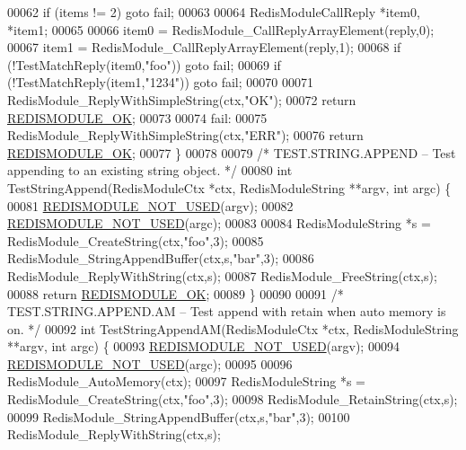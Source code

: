 \begin{DoxyCode}
00062     \textcolor{keywordflow}{if} (items != 2) \textcolor{keywordflow}{goto} fail;
00063 
00064     RedisModuleCallReply *item0, *item1;
00065 
00066     item0 = RedisModule\_CallReplyArrayElement(reply,0);
00067     item1 = RedisModule\_CallReplyArrayElement(reply,1);
00068     \textcolor{keywordflow}{if} (!TestMatchReply(item0,\textcolor{stringliteral}{"foo"})) \textcolor{keywordflow}{goto} fail;
00069     \textcolor{keywordflow}{if} (!TestMatchReply(item1,\textcolor{stringliteral}{"1234"})) \textcolor{keywordflow}{goto} fail;
00070 
00071     RedisModule\_ReplyWithSimpleString(ctx,\textcolor{stringliteral}{"OK"});
00072     \textcolor{keywordflow}{return} \hyperlink{redismodule_8h_a1bc5bfd69abcd378ff52c640adc5418d}{REDISMODULE\_OK};
00073 
00074 fail:
00075     RedisModule\_ReplyWithSimpleString(ctx,\textcolor{stringliteral}{"ERR"});
00076     \textcolor{keywordflow}{return} \hyperlink{redismodule_8h_a1bc5bfd69abcd378ff52c640adc5418d}{REDISMODULE\_OK};
00077 \}
00078 
00079 \textcolor{comment}{/* TEST.STRING.APPEND -- Test appending to an existing string object. */}
00080 \textcolor{keywordtype}{int} TestStringAppend(RedisModuleCtx *ctx, RedisModuleString **argv, \textcolor{keywordtype}{int} argc) \{
00081     \hyperlink{redismodule_8h_a46d75d81383a00bd6b941af6cadf64c2}{REDISMODULE\_NOT\_USED}(argv);
00082     \hyperlink{redismodule_8h_a46d75d81383a00bd6b941af6cadf64c2}{REDISMODULE\_NOT\_USED}(argc);
00083 
00084     RedisModuleString *s = RedisModule\_CreateString(ctx,\textcolor{stringliteral}{"foo"},3);
00085     RedisModule\_StringAppendBuffer(ctx,s,\textcolor{stringliteral}{"bar"},3);
00086     RedisModule\_ReplyWithString(ctx,s);
00087     RedisModule\_FreeString(ctx,s);
00088     \textcolor{keywordflow}{return} \hyperlink{redismodule_8h_a1bc5bfd69abcd378ff52c640adc5418d}{REDISMODULE\_OK};
00089 \}
00090 
00091 \textcolor{comment}{/* TEST.STRING.APPEND.AM -- Test append with retain when auto memory is on. */}
00092 \textcolor{keywordtype}{int} TestStringAppendAM(RedisModuleCtx *ctx, RedisModuleString **argv, \textcolor{keywordtype}{int} argc) \{
00093     \hyperlink{redismodule_8h_a46d75d81383a00bd6b941af6cadf64c2}{REDISMODULE\_NOT\_USED}(argv);
00094     \hyperlink{redismodule_8h_a46d75d81383a00bd6b941af6cadf64c2}{REDISMODULE\_NOT\_USED}(argc);
00095 
00096     RedisModule\_AutoMemory(ctx);
00097     RedisModuleString *s = RedisModule\_CreateString(ctx,\textcolor{stringliteral}{"foo"},3);
00098     RedisModule\_RetainString(ctx,s);
00099     RedisModule\_StringAppendBuffer(ctx,s,\textcolor{stringliteral}{"bar"},3);
00100     RedisModule\_ReplyWithString(ctx,s);

\end{DoxyCode}
